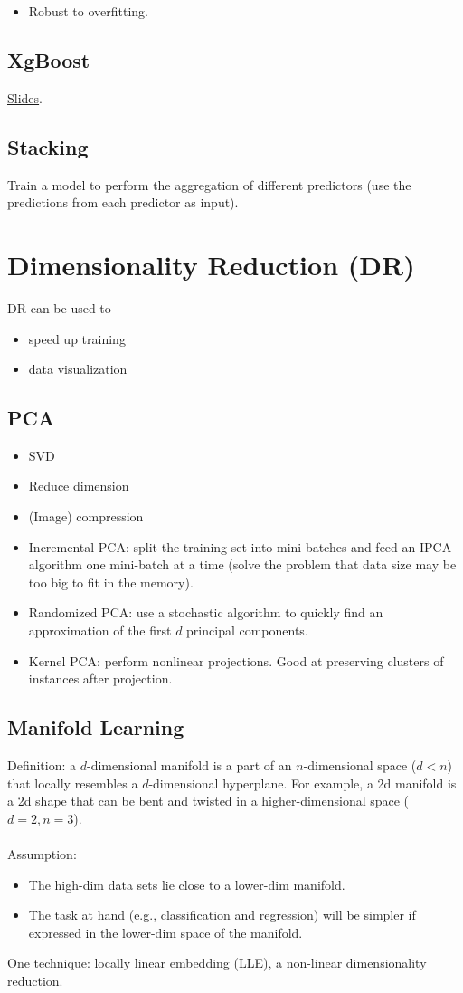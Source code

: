 \documentclass[12pt,oneside,a4paper]{article}
\numberwithin{equation}{section}
\begin{document}
\begin{itemize}
\item Robust to overfitting.
\end{itemize}

\subsection{XgBoost}

\href{https://homes.cs.washington.edu/~tqchen/pdf/BoostedTree.pdf}{Slides}.
\subsection{Stacking}
Train a model to perform the aggregation of different predictors (use the predictions from each predictor as input).
\section{Dimensionality Reduction (DR)}
DR can be used to 
\begin{itemize}
\item speed up training
\item data visualization
\end{itemize}

\subsection{PCA}
\begin{itemize}
\item SVD 
\item Reduce dimension 
\item (Image) compression
\item Incremental PCA: split the training set into mini-batches and feed an IPCA algorithm one mini-batch at a time (solve the problem that data size may be too big to fit in the memory).
\item Randomized PCA: use a stochastic algorithm to quickly find an approximation of the first $d$ principal components. 
\item Kernel PCA: perform nonlinear projections. Good at preserving clusters of instances after projection. 
\end{itemize}
\subsection{Manifold Learning}
Definition: a $d$-dimensional manifold is a part of an $n$-dimensional space ($d < n$) that locally resembles a $d$-dimensional hyperplane. For example, a 2d manifold is a 2d shape that can be bent and twisted in a higher-dimensional space ($d = 2, n = 3$).
\\~\\
Assumption: 
\begin{itemize}
\item The high-dim data sets lie close to a lower-dim manifold. 
\item The task at hand (e.g., classification and regression) will be simpler if expressed in the lower-dim space of the manifold.
\end{itemize}

One technique: locally linear embedding (LLE), a non-linear dimensionality reduction.
\end{document}
